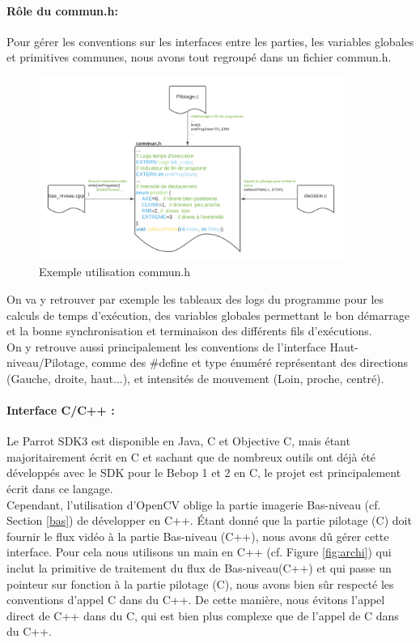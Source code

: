 \documentclass[12pt]{article}
\begin{document}
\paragraph*{Rôle du commun.h:}
Pour gérer les conventions sur les interfaces entre les parties, les variables globales et primitives communes, nous avons tout regroupé dans un fichier commun.h.\\
\begin{figure}[H]
\centering
\includegraphics[height=6cm]{ExCommun.png}
\caption{Exemple utilisation commun.h}
\label{fig:commun}
\end{figure}
On va y retrouver par exemple les tableaux des logs du programme pour les calculs de temps d'exécution, des variables globales permettant le bon démarrage et la bonne synchronisation et terminaison des différents fils d'exécutions.\\
On y retrouve aussi principalement les conventions de l'interface Haut-niveau/Pilotage, comme des \#define et type énuméré représentant des directions (Gauche, droite, haut...), et intensités de mouvement (Loin, proche, centré).
\paragraph*{Interface C/C++ :}
Le Parrot SDK3\cite{SDK} est disponible en Java, C et Objective C, mais étant majoritairement écrit en C et sachant que de nombreux outils ont déjà été développés avec le SDK pour le Bebop 1 et 2 en C, le projet est principalement écrit dans ce langage.\\
Cependant, l'utilisation d'OpenCV oblige la partie imagerie Bas-niveau (cf. Section \ref{bas}) de développer en C++. Étant donné que la partie pilotage (C) doit fournir le flux vidéo à la partie Bas-niveau (C++), nous avons dû gérer cette interface. Pour cela nous utilisons un main en C++ (cf. Figure \ref{fig:archi}) qui inclut la primitive de traitement du flux de Bas-niveau(C++) et qui passe un pointeur sur fonction à la partie pilotage (C), nous avons bien sûr respecté les conventions d'appel C dans du C++. De cette manière, nous évitons l'appel direct de C++ dans du C, qui est bien plus complexe que de l'appel de C dans du C++.
\end{document}
